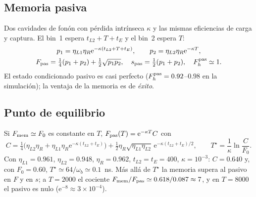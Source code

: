 \documentclass[11pt,a4paper]{article}
\newcommand{\ee}{\mathrm{e}}
\newcommand{\wb}{\omega_b}
\begin{document}
\subsection{Memoria pasiva}
Dos cavidades de fonón con pérdida intrínseca $\kappa$ y las mismas eficiencias de carga y captura. El bin~1 espera $t_{L2}+T+t_E$ y el bin~2 espera $T$:
\begin{gather}
p_1=\eta_{L1}\eta_R\ee^{-\kappa(t_{L2}+T+t_E)},\qquad p_2=\eta_{L2}\eta_R\ee^{-\kappa T},\nonumber\\
F_{\rm pas}=\tfrac14(p_1+p_2)+\tfrac12\sqrt{p_1p_2},\quad s_{\rm pas}=\tfrac12(p_1+p_2),\quad F_h^{\rm pas}\simeq1 .
\end{gather}
El estado condicionado pasivo es casi perfecto ($F_h^{\rm pas}=0.92$--$0.98$ en la simulación); la ventaja de la memoria es de \emph{éxito}.

\subsection{Punto de equilibrio}
Si $F_{\rm mem}\simeq F_0$ es constante en $T$, $F_{\rm pas}(T)=\ee^{-\kappa T}C$ con
\begin{equation}
C=\tfrac14\big(\eta_{L2}\eta_R+\eta_{L1}\eta_R\ee^{-\kappa(t_{L2}+t_E)}\big)+\tfrac12\eta_R\sqrt{\eta_{L1}\eta_{L2}}\,\ee^{-\kappa(t_{L2}+t_E)/2},
\qquad
\boxed{T^\star=\frac1\kappa\ln\frac{C}{F_0}} .\label{eq:Tstar}
\end{equation}
Con $\eta_{L1}=0.961$, $\eta_{L2}=0.948$, $\eta_R=0.962$, $t_{L2}=t_E=400$, $\kappa=10^{-3}$: $C=0.640$ y, con $F_0=0.60$, $T^\star\simeq64/\wb\simeq0.1$~ns. Más allá de $T^\star$ la memoria supera al pasivo en $F$ y en $s$;
a $T=2000$ el cociente $F_{\rm mem}/F_{\rm pas}\simeq0.618/0.087\approx7$, y en $T=8000$ el pasivo es nulo ($\ee^{-8}\approx3\times10^{-4}$).

\end{document}

